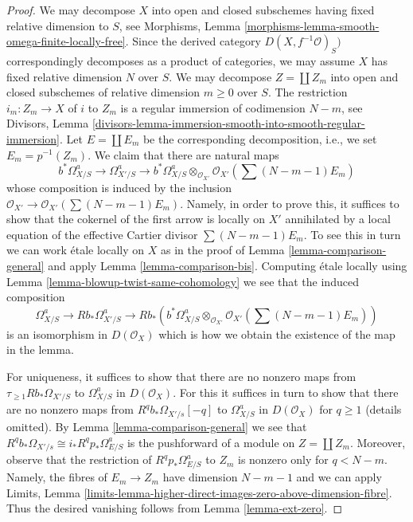 \begin{proof}
We may decompose $X$ into open and closed subschemes
having fixed relative dimension to $S$, see
Morphisms, Lemma \ref{morphisms-lemma-smooth-omega-finite-locally-free}.
Since the derived category $D(X, f^{-1}\mathcal{O})_S)$ correspondingly
decomposes as a product of categories, we may assume $X$ has
fixed relative dimension $N$ over $S$. We may decompose
$Z = \coprod Z_m$ into open and closed subschemes of relative
dimension $m \geq 0$ over $S$. The restriction $i_m : Z_m \to X$ of
$i$ to $Z_m$ is a regular immersion of codimension $N - m$, see Divisors, Lemma
\ref{divisors-lemma-immersion-smooth-into-smooth-regular-immersion}.
Let $E = \coprod E_m$ be the corresponding decomposition, i.e.,
we set $E_m = p^{-1}(Z_m)$. We claim that there are natural maps
$$
b^*\Omega^a_{X/S} \to \Omega^a_{X'/S} \to
b^*\Omega^a_{X/S} \otimes_{\mathcal{O}_{X'}}
\mathcal{O}_{X'}(\sum (N - m - 1)E_m)
$$
whose composition is induced by the inclusion
$\mathcal{O}_{X'} \to \mathcal{O}_{X'}(\sum (N - m - 1)E_m)$.
Namely, in order to prove this, it suffices to show that the
cokernel of the first arrow is locally on $X'$ annihilated by
a local equation of the effective Cartier divisor $\sum (N - m - 1)E_m$.
To see this in turn we can work \'etale locally on $X$ as in the
proof of Lemma \ref{lemma-comparison-general} and apply
Lemma \ref{lemma-comparison-bis}.
Computing \'etale locally using Lemma \ref{lemma-blowup-twist-same-cohomology}
we see that the induced composition
$$
\Omega^a_{X/S} \to Rb_*\Omega^a_{X'/S} \to
Rb_*\left(b^*\Omega^a_{X/S} \otimes_{\mathcal{O}_{X'}}
\mathcal{O}_{X'}(\sum (N - m - 1)E_m)\right)
$$
is an isomorphism in $D(\mathcal{O}_X)$
which is how we obtain the existence of the map in the lemma.

\medskip\noindent
For uniqueness, it suffices to show that there are no nonzero maps from
$\tau_{\geq 1}Rb_*\Omega_{X'/S}$ to $\Omega^a_{X/S}$ in $D(\mathcal{O}_X)$.
For this it suffices in turn to show that there are no nonzero maps
from $R^qb_*\Omega_{X'/s}[-q]$ to $\Omega^a_{X/S}$ in $D(\mathcal{O}_X)$
for $q \geq 1$ (details omitted). By
Lemma \ref{lemma-comparison-general}
we see that $R^qb_*\Omega_{X'/s} \cong i_*R^qp_*\Omega^a_{E/S}$
is the pushforward of a module on $Z = \coprod Z_m$.
Moreover, observe that the restriction of $R^qp_*\Omega^a_{E/S}$
to $Z_m$ is nonzero only for $q < N - m$. Namely, the fibres of
$E_m \to Z_m$ have dimension $N - m - 1$ and we can apply Limits, Lemma
\ref{limits-lemma-higher-direct-images-zero-above-dimension-fibre}.
Thus the desired vanishing follows from Lemma \ref{lemma-ext-zero}.
\end{proof}














